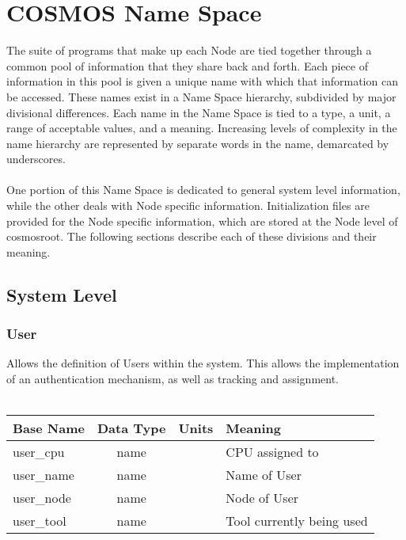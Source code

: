 \documentclass[10pt,letterpaper]{report}
\begin{document}
\chapter{COSMOS Name Space}
The suite of programs that make up each Node are tied together through a common pool of information that they share back and forth. Each piece of information in this pool is given a unique name with which that information can be accessed. These names exist in a Name Space hierarchy, subdivided by major divisional differences. Each name in the Name Space is tied to a type, a unit, a range of acceptable values, and a meaning. Increasing levels of complexity in the name hierarchy are represented by separate words in the name, demarcated by underscores.
\\
\\
One portion of this Name Space is dedicated to general system level information, while the other deals with Node specific information. Initialization files are provided for the Node specific information, which are stored at the Node level of cosmosroot. The following sections describe each of these divisions and their meaning.
\section{System Level}
\subsection{User}
Allows the definition of Users within the system. This allows the implementation of an authentication mechanism, as well as tracking and assignment.
\\
\\
\begin{tabular}{|l|c|l|l|}
\hline \textbf{Base Name} &\textbf{Data Type}  & \textbf{Units} & \textbf{Meaning}\\ 
\hline user\_cpu & name &  & CPU assigned to \\ 
\hline user\_name & name &  & Name of User \\ 
\hline user\_node & name &  & Node of User \\ 
\hline user\_tool & name &  & Tool currently being used \\ 
\hline 
\end{tabular} 
\end{document}
